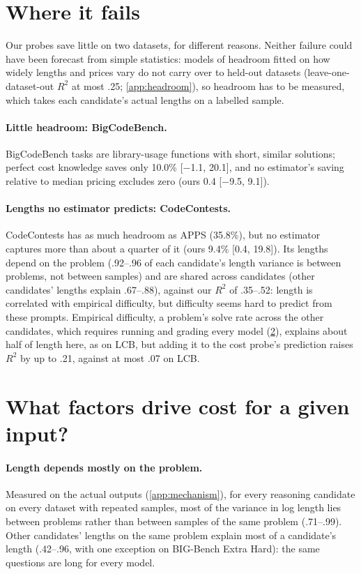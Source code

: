 \documentclass[10pt]{article}
\begin{document}
\section{Where it fails}\label{sec:when}
Our probes save little on two datasets, for different reasons. Neither failure could have been forecast from simple statistics: models of headroom fitted on how widely lengths and prices vary do not carry over to held-out datasets (leave-one-dataset-out $R^2$ at most .25; \cref{app:headroom}), so headroom has to be measured, which takes each candidate's actual lengths on a labelled sample.

\paragraph{Little headroom: BigCodeBench.}
BigCodeBench tasks are library-usage functions with short, similar solutions; perfect cost knowledge saves only 10.0\% [$-$1.1, 20.1], and no estimator's saving relative to median pricing excludes zero (ours 0.4 [$-$9.5, 9.1]).

\paragraph{Lengths no estimator predicts: CodeContests.}
CodeContests has as much headroom as APPS (35.8\%), but no estimator captures more than about a quarter of it (ours 9.4\% [0.4, 19.8]). Its lengths depend on the problem (.92--.96 of each candidate's length variance is between problems, not between samples) and are shared across candidates (other candidates' lengths explain .67--.88), against our $R^2$ of .35--.52: length is correlated with empirical difficulty, but difficulty seems hard to predict from these prompts. Empirical difficulty, a problem's solve rate across the other candidates, which requires running and grading every model (\cref{sec:mechanism}), explains about half of length here, as on LCB, but adding it to the cost probe's prediction raises $R^2$ by up to .21, against at most .07 on LCB.

\section{What factors drive cost for a given input?}\label{sec:mechanism}
\paragraph{Length depends mostly on the problem.}
Measured on the actual outputs (\cref{app:mechanism}), for every reasoning candidate on every dataset with repeated samples, most of the variance in log length lies between problems rather than between samples of the same problem (.71--.99). Other candidates' lengths on the same problem explain most of a candidate's length (.42--.96, with one exception on BIG-Bench Extra Hard): the same questions are long for every model.
\end{document}
